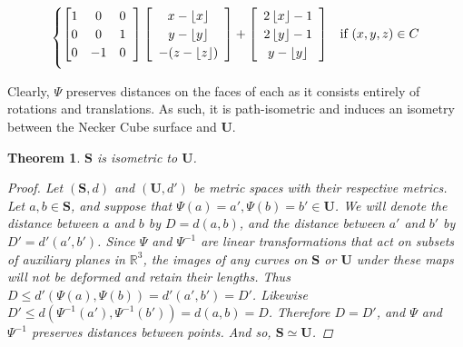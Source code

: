 \documentclass[]{article}
\newtheorem{thm}{Theorem}[section]
\begin{document}
\begin{equation}
\begin{cases}
		\left[ \begin{matrix}
		1 & 0 & 0 \\
		0 & 0 & 1 \\
		0 & -1 & 0
		\end{matrix}\hspace{2mm}\right]
		\left[\begin{array}{c}
			x - \left\lfloor x \right\rfloor
			\\ y- \left\lfloor y \right\rfloor
			\\ -(z - \left\lfloor z \right\rfloor)
			\end{array} \right]
		+
			\left[\begin{array}{c}
				2 \left\lfloor x \right\rfloor - 1
				\\ 2\left\lfloor y \right\rfloor - 1
				\\ y - \left\lfloor y \right\rfloor
			\end{array} \right]
				& \text{if } (x,y,z)\in C	\vspace{2mm}
\end{cases}
\end{equation}

Clearly, $\Psi$ preserves distances on the faces of each as it consists entirely of rotations and translations. As such, it is path-isometric and induces an isometry between the Necker Cube surface and $\mathbf U$.

\begin{thm}{$\mathbf{S}$ is isometric to  $\mathbf{U}$.}
\begin{proof}

Let $(\mathbf{S}, d)$ and $(\mathbf{U}, d')$ be metric spaces with their respective metrics. Let $a,b\in\mathbf{S}$, and suppose that $\Psi(a)=a',\Psi(b)=b'\in\mathbf{U}$. We will denote the distance between $a$ and $b$ by $D=d(a,b)$, and the distance between $a'$ and $b'$ by $D'=d'(a',b')$. Since $\Psi$ and $\Psi^{-1}$ are linear transformations that act on subsets of auxiliary planes in $\mathbb{R}^{3}$, the images of any curves on $\mathbf{S}$ or $\mathbf{U}$ under these maps will not be deformed and retain their lengths. Thus $D \leq d'(\Psi(a), \Psi(b)) = d'(a',b') = D'$. Likewise $D' \leq d(\Psi^{-1}(a'),\Psi^{-1}(b')) = d(a,b) = D$. Therefore $D=D'$, and $\Psi$ and $\Psi^{-1}$ preserves distances between points. And so, $\mathbf{S}\simeq\mathbf{U}$.
\end{proof} 
\end{thm}
\end{document}
